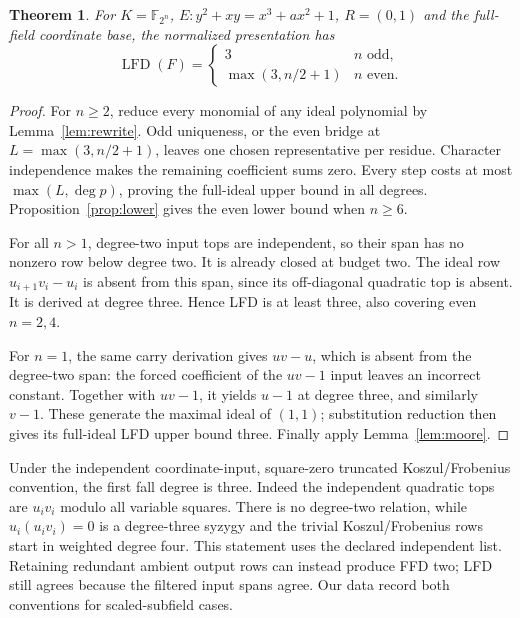 \documentclass[11pt]{article}
\newtheorem{theorem}{Theorem}
\theoremstyle{remark}\newtheorem{remark}[theorem]{Remark}
\newcommand{\F}{\mathbb F}
\newcommand{\lfd}{\operatorname{LFD}}
\begin{document}
\begin{theorem}\label{thm:inverse}
For $K=\F_{2^n}$, $E:y^2+xy=x^3+ax^2+1$, $R=(0,1)$ and the full-field
coordinate base, the normalized presentation has
\[
 \lfd(F)=\begin{cases}3&n\text{ odd},\\
                      \max(3,n/2+1)&n\text{ even}.
          \end{cases}
\]
\end{theorem}
\begin{proof}
For $n\ge2$, reduce every monomial of any ideal polynomial by
Lemma~\ref{lem:rewrite}. Odd uniqueness, or the even bridge at
$L=\max(3,n/2+1)$, leaves one chosen representative per residue.
Character independence makes the remaining coefficient sums zero.
Every step costs at most $\max(L,\deg p)$, proving the full-ideal upper
bound in all degrees. Proposition~\ref{prop:lower} gives the even lower
bound when $n\ge6$.

For all $n>1$, degree-two input tops are independent, so their span has
no nonzero row below degree two. It is already closed at budget two.
The ideal row $u_{i+1}v_i-u_i$ is absent from this span, since its
off-diagonal quadratic top is absent. It is derived at degree three.
Hence LFD is at least three, also covering even $n=2,4$.

For $n=1$, the same carry derivation gives $uv-u$, which is absent from
the degree-two span: the forced coefficient of the $uv-1$ input leaves
an incorrect constant. Together with $uv-1$, it yields $u-1$ at degree
three, and similarly $v-1$. These generate the maximal ideal of $(1,1)$;
substitution reduction then gives its full-ideal LFD upper bound three.
Finally apply Lemma~\ref{lem:moore}.
\end{proof}

Under the independent coordinate-input, square-zero truncated
Koszul/Frobenius convention, the first fall degree is three. Indeed the
independent quadratic tops are $u_iv_i$ modulo all variable squares.
There is no degree-two relation, while $u_i(u_iv_i)=0$ is a degree-three
syzygy and the trivial Koszul/Frobenius rows start in weighted degree four.
This statement uses the declared independent list. Retaining redundant
ambient output rows can instead produce FFD two; LFD still agrees because
the filtered input spans agree. Our data record both conventions for
scaled-subfield cases.
\end{document}
